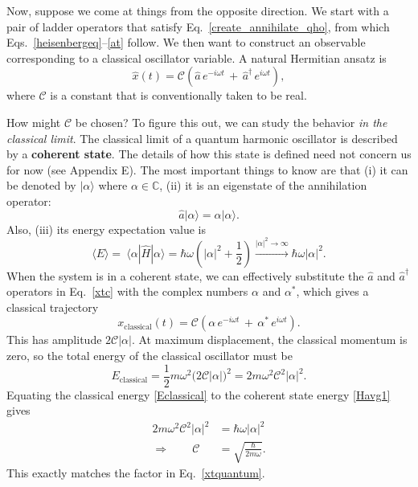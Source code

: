 \documentclass[prx,12pt]{revtex4-2}
\begin{document}
Now, suppose we come at things from the opposite direction.  We start
with a pair of ladder operators that satisfy
Eq.~\eqref{create_annihilate_qho}, from which
Eqs.~\eqref{heisenbergeq}--\eqref{at} follow.  We then want to
construct an observable corresponding to a classical oscillator
variable.  A natural Hermitian ansatz is
\begin{equation}
  \hat{x}(t) = 
  \mathcal{C} \left(\hat{a} \,e^{-i\omega t} \,+\,
  \hat{a}^\dagger\, e^{i\omega t}\right),
  \label{xtc}
\end{equation}
where $\mathcal{C}$ is a constant that is conventionally taken to be
real.

How might $\mathcal{C}$ be chosen?  To figure this out, we can study
the behavior \textit{in the classical limit}.  The classical limit of
a quantum harmonic oscillator is described by a \textbf{coherent
  state}.  The details of how this state is defined need not concern
us for now (see Appendix E).  The most important things to know are
that (i) it can be denoted by $|\alpha\rangle$ where $\alpha \in
\mathbb{C}$, (ii) it is an eigenstate of the annihilation operator:
\begin{equation}
  \hat{a}|\alpha\rangle = \alpha|\alpha\rangle.
  \label{coherent}
\end{equation}
Also, (iii) its energy expectation value is
\begin{equation}
  \langle E\rangle = \ \langle\alpha|\hat{H}|\alpha\rangle = \hbar
  \omega \left(|\alpha|^2 + \frac{1}{2}\right)
  \overset{|\alpha|^2\rightarrow\infty}{\longrightarrow} \hbar \omega
  |\alpha|^2.
  \label{Havg1}
\end{equation}
When the system is in a coherent state, we can effectively substitute
the $\hat{a}$ and $\hat{a}^\dagger$ operators in Eq.~\eqref{xtc} with
the complex numbers $\alpha$ and $\alpha^*$, which gives a classical
trajectory
\begin{equation}
  x_{\mathrm{classical}}(t) = \mathcal{C} \left(\alpha \,e^{-i\omega t} \,+\,
  \alpha^*\, e^{i\omega t}\right).
  \label{xtc2}
\end{equation}
This has amplitude $2\mathcal{C}|\alpha|$.  At maximum displacement,
the classical momentum is zero, so the total energy of the classical
oscillator must be
\begin{equation}
  E_{\mathrm{classical}}
  = \frac{1}{2} m\omega^2 \Big(2\mathcal{C}|\alpha|\Big)^2
  = 2m\omega^2 \mathcal{C}^2 |\alpha|^2.
  \label{Eclassical}
\end{equation}
Equating the classical energy \eqref{Eclassical} to the coherent state
energy \eqref{Havg1} gives
\begin{align}
  2m\omega^2 \mathcal{C}^2 |\alpha|^2 &= \hbar \omega
  |\alpha|^2 \\ \Rightarrow \qquad
  \mathcal{C} &= \sqrt{\frac{\hbar}{2m\omega}}.
\end{align}
This exactly matches the factor in Eq.~\eqref{xtquantum}.
\end{document}

